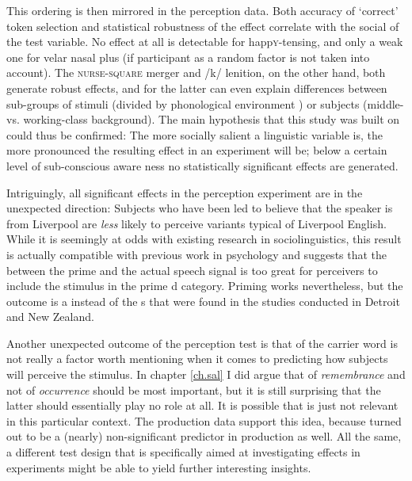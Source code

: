 This ordering is then mirrored in the perception data.
Both accuracy of `correct' token selection and statistical robustness of the  effect correlate with the social  of the test variable.
No effect at all is detectable for happ\textsc{y}-tensing, and only a weak one for velar nasal plus (if participant as a random factor is not taken into account).
The \textsc{nurse}-\textsc{square} merger and /k/ lenition, on the other hand, both generate robust  effects, and for the latter  can even explain differences between sub-groups of stimuli (divided by phonological environment ) or subjects (middle- vs. working-class background).
The main hypothesis that this study was built on could thus be confirmed: The more socially salient  a linguistic variable is, the more pronounced the resulting effect in an   experiment will be; below a certain level of sub-conscious  aware ness no statistically significant  effects are generated.

Intriguingly, all significant effects in the perception experiment are in the unexpected direction: Subjects who have been led to believe that the speaker is from Liverpool are \emph{less} likely to perceive variants typical of Liverpool English.
While it is seemingly at odds with existing  research in sociolinguistics, this result is actually compatible with previous work in psychology and suggests that the  between the prime  and the actual speech signal is too great for perceivers to include the stimulus in the prime d category.
Priming  works nevertheless, but the outcome is a  instead of the s that were found in the studies conducted in Detroit and New Zealand.

Another unexpected outcome of the perception test is that  of the carrier word is not really a factor worth mentioning when it comes to predicting how subjects will perceive the stimulus.
In chapter \ref{ch.sal} I did argue that  of \emph{remembrance } and not  of \emph{occurrence} should be most important, but it is still surprising that the latter should essentially play no role at all.
It is possible that  is just not relevant in this particular context.
The production data support this idea, because  turned out to be a (nearly) non-significant predictor in production as well.
All the same, a different test design that is specifically aimed at investigating  effects in  experiments might be able to yield further interesting insights.

